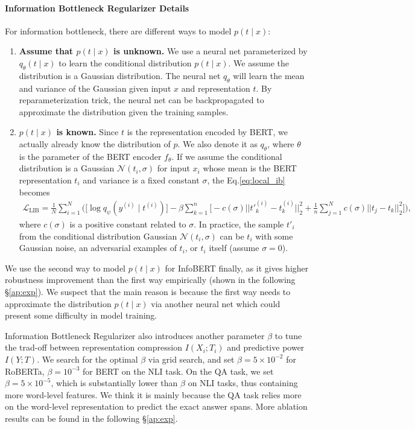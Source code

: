 \documentclass{article} \usepackage{iclr2021_conference,times}
\theoremstyle{definition}
\theoremstyle{remark}
\newcommand{\method}{InfoBERT\xspace}
\begin{document}
\paragraph{Information Bottleneck Regularizer Details} For information bottleneck, there are different ways to model $p(t \mid x)$: 
\begin{enumerate}[leftmargin=*]
    \item \textbf{Assume that $p(t \mid x)$ is unknown.} We use a neural net parameterized by $q_\theta(t \mid x)$ to learn the conditional distribution $p(t \mid x)$. We assume the distribution is a Gaussian distribution. The neural net $q_\theta$ will learn the mean and variance of the Gaussian given input ${x}$ and representation ${t}$. By reparameterization trick, the neural net can be backpropagated to approximate the distribution given the training samples.
    \item \textbf{$p(t \mid x)$ is known.} Since ${t}$ is the representation encoded by BERT, we actually already know the distribution of $p$. We also denote it as $q_\theta$, where $\theta$ is the parameter of the BERT encoder $f_\theta$. If we assume the conditional distribution is a Gaussian $\mathcal{N}({t}_i, \sigma)$ for input $x_i$ whose mean is the BERT representation $t_i$ and variance is a fixed constant $\sigma$, the Eq.\ref{eq:local_ib} becomes
\begin{align}
    \label{eq:l2}
    \mathcal{L}_{\text{LIB}} = \frac{1}{N}\sum_{i=1}^{N} \Bigg( \big[ \log q_\psi({y}^{(i)} \mid {t}^{(i)}) \big] - \beta  \sum_{k=1}^{n} \Big[- 
    c(\sigma) || {t}'^{(i)}_k - {t}^{(i)}_k ||^2_2  +  \frac{1}{n} \sum_{j=1}^{N} c(\sigma) ||{t}_j - {t}_k ||^2_2  \Big] \Bigg),
\end{align}
    where $ c(\sigma)$ is a positive constant related to $\sigma$. In practice, the sample ${t}'_i$ from the conditional distribution Gaussian $\mathcal{N}({t}_i, \sigma)$  can be ${t}_i$ with some Gaussian noise, an adversarial examples of ${t}_i$, or ${t}_i$ itself (assume $\sigma=0$).
\end{enumerate}

We use the second way to model $p(t \mid x)$ for \method finally, as it gives higher robustness improvement than the first way empirically (shown in the following \S\ref{ap:exp}). We suspect that the main reason is because the first way needs to approximate the distribution $p(t \mid x)$ via another neural net which could present some difficulty in model training. 

Information Bottleneck Regularizer also introduces another parameter $\beta$ to tune the trad-off between representation compression $I(X_i;T_i)$ and predictive power $I(Y;T)$. We search for the optimal $\beta$ via grid search, and set $\beta=5 \times 10^{-2}$ for RoBERTa, $\beta=10^{-3}$ for BERT on the NLI task. On the QA task, we set $\beta=5 \times 10^{-5}$, which is substantially lower than $\beta$ on NLI tasks, thus containing more word-level features. We think it is mainly because the QA task relies more on the word-level representation to predict the exact answer spans. More ablation results can be found in the following \S\ref{ap:exp}.
\end{document}
